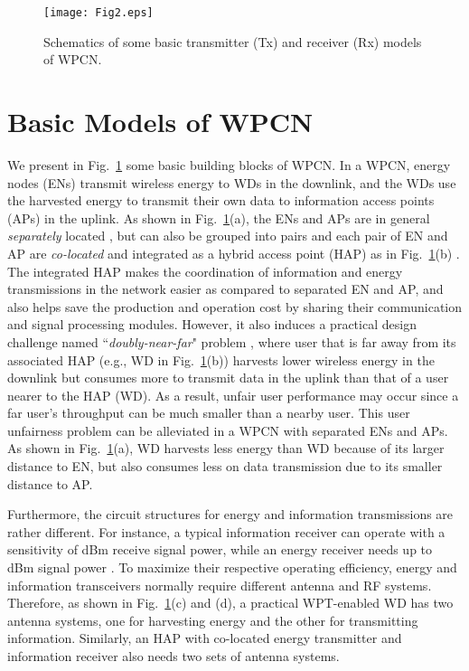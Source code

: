 \documentclass[journal, draftcls, one column, 12pt]{IEEEtran}
\begin{document}
\begin{figure}
\centering
  \begin{center}
    \texttt{[image: Fig2.eps]}
  \end{center}
  \caption{Schematics of some basic transmitter (Tx) and receiver (Rx) models of WPCN.}
  \label{72}
\end{figure}

\section{Basic Models of WPCN}
We present in Fig.~\ref{72} some basic building blocks of WPCN. In a WPCN, energy nodes (ENs) transmit wireless energy to WDs in the downlink, and the WDs use the harvested energy to transmit their own data to information access points (APs) in the uplink. As shown in Fig.~\ref{72}(a), the ENs and APs are in general \emph{separately} located \cite{2014:Huang}, but can also be grouped into pairs and each pair of EN and AP are \emph{co-located} and integrated as a hybrid access point (HAP) as in Fig.~\ref{72}(b) \cite{2014:Ju}. The integrated HAP makes the coordination of information and energy transmissions in the network easier as compared to separated EN and AP, and also helps save the production and operation cost by sharing their communication and signal processing modules. However, it also induces a practical design challenge named ``\emph{doubly-near-far}" problem \cite{2014:Ju}, where user that is far away from its associated HAP (e.g., WD in Fig.~\ref{72}(b)) harvests lower wireless energy in the downlink but consumes more to transmit data in the uplink than that of a user nearer to the HAP (WD). As a result, unfair user performance may occur since a far user's throughput can be much smaller than a nearby user. This user unfairness problem can be alleviated in a WPCN with separated ENs and APs. As shown in Fig.~\ref{72}(a), WD harvests less energy than WD because of its larger distance to EN, but also consumes less on data transmission due to its smaller distance to AP.

Furthermore, the circuit structures for energy and information transmissions are rather different. For instance, a typical information receiver can operate with a sensitivity of  dBm receive signal power, while an energy receiver needs up to  dBm signal power \cite{2015:Bi}. To maximize their respective operating efficiency, energy and information transceivers normally require different antenna and RF systems. Therefore, as shown in Fig.~\ref{72}(c) and (d), a practical WPT-enabled WD has two antenna systems, one for harvesting energy and the other for transmitting information. Similarly, an HAP with co-located energy transmitter and information receiver also needs two sets of antenna systems.
\end{document}

